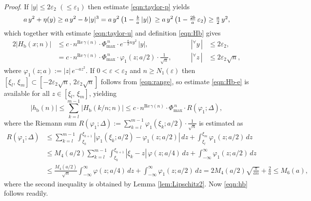 \documentclass[a4paper,12pt]{article}
\theoremstyle{plain}
\def\rb{\mathrm{b}}
\def\rRe{\mathrm{Re}}
\def\ve{\varepsilon}
\def\vD{\varDelta}
\def\Phim{\Phi_{\scriptstyle \mathrm{max}}}
\def\ts{\textstyle}
\begin{document}
{\it Proof}. 
If $| y | \le 2 \ve_2$ $(\le \ve_1)$ then estimate 
\eqref{eqn:taylor-p} yields    
\[
a \, y^2 + \eta( y ) 
\ge a \, y^2 - b \, |y|^3 = a \, y^2 
\left(1 - \ts \frac{b}{a} \, |y| \right) \\ 
\ge a \, y^2 \left( 1 - \ts \frac{2 b}{a}\, \ve_2 \right) 
\ge \ts \frac{a}{2} \, y^2,  
\]
which together with estimate \eqref{eqn:taylor-u} and definition 
\eqref{eqn:Hb} gives 
\begin{alignat}{2}
|H_{\rb}(x; n)| 
&\le c \cdot n^{\rRe \, \gamma(n)} \cdot \Phim^{\, n} \cdot 
e^{ - \frac{a}{2} n y^2} \, | y |, \qquad & 
|{}^{\forall} y \, | &\le 2 \ve_2, \nonumber \\[2mm]
&= c \cdot n^{\rRe \, \gamma(n)} \cdot \Phim^{\, n} \cdot 
\varphi_1(z; a/2) \cdot \ts \frac{1}{\sqrt{n}}, \qquad &  
|{}^{\forall} z \,| &\le 2 \ve_2 \sqrt{n},  \label{eqn:Hb-e}
\end{alignat} 
where $\varphi_1(z; a) := |z| \, e^{- a z^2}$. 
If $0 < \ve < \ve_2$ and $n \ge N_1(\ve)$ then $[\xi_l, \, \xi_m] \subset 
[- 2 \ve_2 \sqrt{n}, \, 2 \ve_2 \sqrt{n}]$ follows from \eqref{eqn:range}, so 
estimate \eqref{eqn:Hb-e} is available for all $z \in [\xi_l, \, \xi_m]$, yielding  
\[
| h_{\rb}(n) | \le \sum_{k=l}^{m-1} | H_{\rb} (k/n; n)| 
\le c \cdot n^{\rRe \, \gamma(n)} \cdot \Phim^{\, n} \cdot R(\varphi_1; \vD),   
\]
where the Riemann sum $R(\varphi_1; \vD) := \sum_{k=l}^{m-1} 
\varphi_1(\xi_k; a/2) \cdot \frac{1}{\sqrt{n}}$ is estimated as  
\begin{align*}
R(\varphi_1; \vD) & \le 
\sum_{k=l}^{m-1} \int_{\xi_k}^{\xi_{k+1}} |\varphi_1(\xi_k; a/2) - \varphi_1(z; a/2) | \, d z 
+ \int_{\xi_l}^{\xi_m} \varphi_1(z; a/2) \, d z \\
& \le M_4(a/2) \sum_{k=l}^{m-1} \int_{\xi_k}^{\xi_{k+1}} | \xi_k - z | \, \varphi(z; a/4) \, d z 
+ \int_{-\infty}^{\infty} \varphi_1(z; a/2) \, d z \\
& \le \frac{M_4(a/2)}{\sqrt{n}} \int_{-\infty}^{\infty} \varphi(z; a/4) \, d z + 
\int_{-\infty}^{\infty} \varphi_1(z; a/2) \, d z = 
2 M_4(a/2) \sqrt{\frac{\pi}{a n}} + \frac{2}{a} \le M_6(a), 
\end{align*} 
where the second inequality is obtained by Lemma \ref{lem:Lipschitz2}. 
Now \eqref{eqn:hb} follows readily. 
\par
\end{document}
